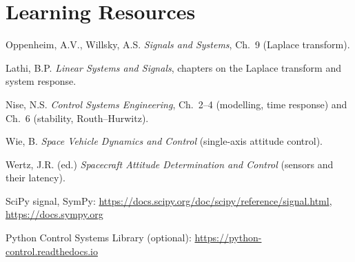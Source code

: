 \documentclass[11pt,a4paper]{article}
\begin{document}
\section*{Learning Resources}
\begin{resources}
  \item Oppenheim, A.V., Willsky, A.S. \emph{Signals and Systems}, Ch.~9 (Laplace transform).
  \item Lathi, B.P. \emph{Linear Systems and Signals}, chapters on the Laplace transform and system response.
  \item Nise, N.S. \emph{Control Systems Engineering}, Ch.~2--4 (modelling, time response) and Ch.~6 (stability, Routh--Hurwitz).
\end{resources}
\begin{resources}
  \item Wie, B. \emph{Space Vehicle Dynamics and Control} (single-axis attitude control).
  \item Wertz, J.R. (ed.) \emph{Spacecraft Attitude Determination and Control} (sensors and their latency).
\end{resources}
\begin{resources}
  \item SciPy signal, SymPy: \url{https://docs.scipy.org/doc/scipy/reference/signal.html}, \url{https://docs.sympy.org}
  \item Python Control Systems Library (optional): \url{https://python-control.readthedocs.io}
\end{resources}

\evaluation
\end{document}
